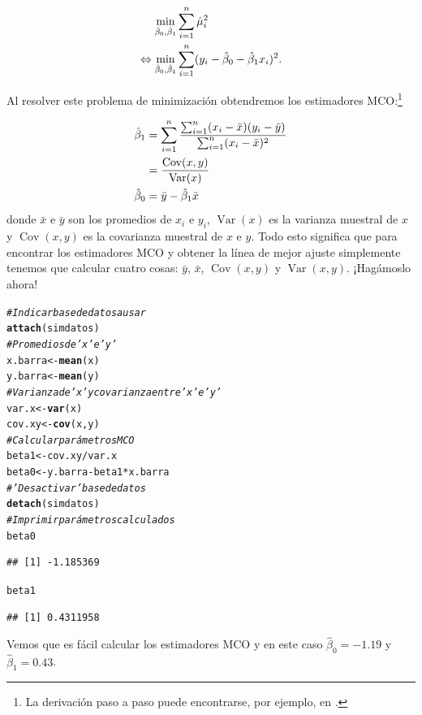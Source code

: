 \documentclass{article}\usepackage[]{graphicx}\usepackage[]{color}
\makeatletter
\newcommand{\hlcom}[1]{\textcolor[rgb]{0.678,0.584,0.686}{\textit{#1}}}%
\newcommand{\hlopt}[1]{\textcolor[rgb]{0,0,0}{#1}}%
\newcommand{\hlstd}[1]{\textcolor[rgb]{0.345,0.345,0.345}{#1}}%
\newcommand{\hlkwb}[1]{\textcolor[rgb]{0.69,0.353,0.396}{#1}}%
\newcommand{\hlkwd}[1]{\textcolor[rgb]{0.737,0.353,0.396}{\textbf{#1}}}%
\newenvironment{kframe}{%
 \def\at@end@of@kframe{}%
 \ifinner\ifhmode%
  \def\at@end@of@kframe{\end{minipage}}%
  \begin{minipage}{\columnwidth}%
 \fi\fi%
 \def\FrameCommand##1{\hskip\@totalleftmargin \hskip-\fboxsep
 \colorbox{shadecolor}{##1}\hskip-\fboxsep
     \hskip-\linewidth \hskip-\@totalleftmargin \hskip\columnwidth}%
 \MakeFramed {\advance\hsize-\width
   \@totalleftmargin\z@ \linewidth\hsize
   \@setminipage}}%
 {\par\unskip\endMakeFramed%
 \at@end@of@kframe}
\newenvironment{knitrout}{}{} %
\newcommand{\Var}{\operatorname{Var}}
\newcommand{\Cov}{\operatorname{Cov}}
\makeatother
\begin{document}
\begin{align}
\min_{\hat\beta_0,\hat\beta_1} & \sum_{i=1}^n \hat\mu_i^2 \notag \\
\Leftrightarrow \min_{\hat\beta_0,\hat\beta_1} & \sum_{i=1}^n (y_i - \hat\beta_0 - \hat\beta_1 x_i)^2.
\end{align}

Al resolver este problema de minimización obtendremos los estimadores MCO:\footnote{La derivación paso a paso puede encontrarse, por ejemplo, en \textcite[cap. 2]{wooldridge_introductory_2013}.}

\begin{align}
\hat \beta_1 &= \sum_{i=1}^n \frac{\sum_{i=1}^n (x_i - \bar x)(y_i - \bar y)}{\sum_{i=1}^n (x_i - \bar x)^2} \notag \\
 &= \frac{\Cov (x,y)}{\Var(x)} \\
\hat \beta_0 &= \bar y - \hat\beta_1 \bar x
\end{align}
donde $\bar x$ e $\bar y$ son los promedios de $x_i$ e $y_i$, $\Var(x)$ es la varianza muestral de $x$ y $\Cov(x,y)$ es la covarianza muestral de $x$ e $y$.
Todo esto significa que para encontrar los estimadores MCO y obtener la línea de mejor ajuste simplemente tenemos que calcular cuatro cosas: $\bar y$, $\bar x$, $\Cov (x,y)$ y $\Var (x,y)$. ¡Hagámoslo ahora!

\begin{knitrout}
\color{fgcolor}\begin{kframe}
\begin{alltt}
\hlcom{# Indicar base de datos a usar}
\hlkwd{attach}\hlstd{(simdatos)}
\hlcom{# Promedios de 'x' e 'y'}
\hlstd{x.barra} \hlkwb{<-} \hlkwd{mean}\hlstd{(x)}
\hlstd{y.barra} \hlkwb{<-} \hlkwd{mean}\hlstd{(y)}
\hlcom{# Varianza de 'x' y covarianza entre 'x' e 'y'}
\hlstd{var.x} \hlkwb{<-} \hlkwd{var}\hlstd{(x)}
\hlstd{cov.xy} \hlkwb{<-} \hlkwd{cov}\hlstd{(x,y)}
\hlcom{# Calcular parámetros MCO}
\hlstd{beta1} \hlkwb{<-} \hlstd{cov.xy}\hlopt{/}\hlstd{var.x}
\hlstd{beta0} \hlkwb{<-} \hlstd{y.barra} \hlopt{-} \hlstd{beta1}\hlopt{*}\hlstd{x.barra}
\hlcom{# 'Desactivar' base de datos}
\hlkwd{detach}\hlstd{(simdatos)}
\hlcom{# Imprimir parámetros calculados}
\hlstd{beta0}
\end{alltt}
\begin{verbatim}
## [1] -1.185369
\end{verbatim}
\begin{alltt}
\hlstd{beta1}
\end{alltt}
\begin{verbatim}
## [1] 0.4311958
\end{verbatim}
\end{kframe}
\end{knitrout}
Vemos que es fácil calcular los estimadores MCO y en este caso $\hat \beta_0 = -1.19$ y $\hat \beta_1 = 0.43$.
\end{document}

